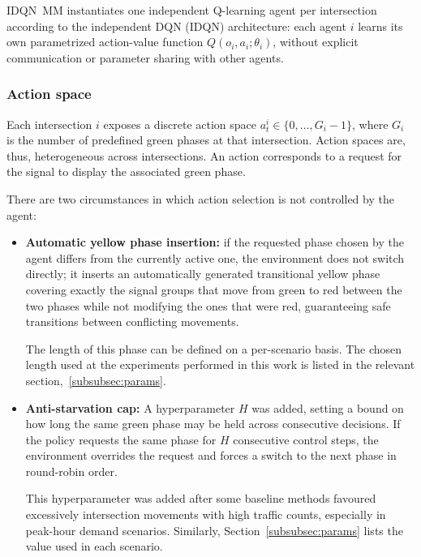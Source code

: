 IDQN~MM instantiates one independent Q-learning agent per intersection according to the independent DQN (IDQN) architecture: each agent $i$ learns its own parametrized action-value function $Q(o_i, a_i; \theta_i)$, without explicit communication or parameter sharing with other agents.

\subsubsection {Action space} \label{subsubsec:idqn_action_space}

Each intersection $i$ exposes a discrete action space $a_t^i \in \{0, \dots, G_i - 1\}$, where $G_i$ is the number of predefined green phases at that intersection. Action spaces are, thus, heterogeneous across intersections. An action corresponds to a request for the signal to display the associated green phase.

\medskip

\noindent There are two circumstances in which action selection is not controlled by the agent:
 
\begin{itemize}
\item \textbf{Automatic yellow phase insertion:} if the requested phase chosen by the agent differs from the currently active one, the environment does not switch directly; it inserts an automatically generated transitional yellow phase covering exactly the signal groups that move from green to red  between the two phases while not modifying the ones that were red, guaranteeing safe transitions between conflicting movements.

The length of this phase can be defined on a per-scenario basis. The chosen length used at the experiments performed in this work is listed in the relevant section,~\ref{subsubsec:params}.

\item \textbf{Anti-starvation cap:} A hyperparameter $H$ was added, setting a bound on how long the same green phase may be held across consecutive decisions. If the policy requests the same phase for $H$ consecutive control steps, the environment overrides the request and forces a switch to the next phase in round-robin order.

This hyperparameter was added after some baseline methods favoured excessively intersection movements with high traffic counts, especially in peak-hour demand scenarios. Similarly, Section~\ref{subsubsec:params} lists the value used in each scenario. 
\end{itemize}
 
